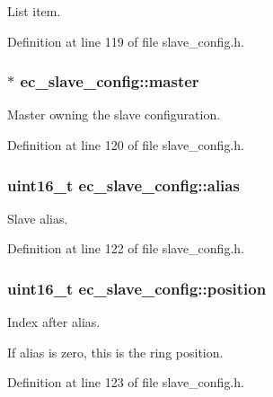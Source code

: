 \-List item. 



\-Definition at line 119 of file slave\-\_\-config.\-h.

\subsubsection[{master}]{$\ast$ {\bf ec\-\_\-slave\-\_\-config\-::master}}\label{structec__slave__config_ac5bef8d37047b658df7b56f7ebdbfecb}


\-Master owning the slave configuration. 



\-Definition at line 120 of file slave\-\_\-config.\-h.

\subsubsection[{alias}]{\setlength{\rightskip}{0pt plus 5cm}uint16\-\_\-t {\bf ec\-\_\-slave\-\_\-config\-::alias}}\label{structec__slave__config_a62dbce2ad4cf9367261c293534d0730c}


\-Slave alias. 



\-Definition at line 122 of file slave\-\_\-config.\-h.

\subsubsection[{position}]{\setlength{\rightskip}{0pt plus 5cm}uint16\-\_\-t {\bf ec\-\_\-slave\-\_\-config\-::position}}\label{structec__slave__config_adf5176b65d59852f91125066b6bf3f07}


\-Index after alias. 

\-If alias is zero, this is the ring position. 

\-Definition at line 123 of file slave\-\_\-config.\-h.


